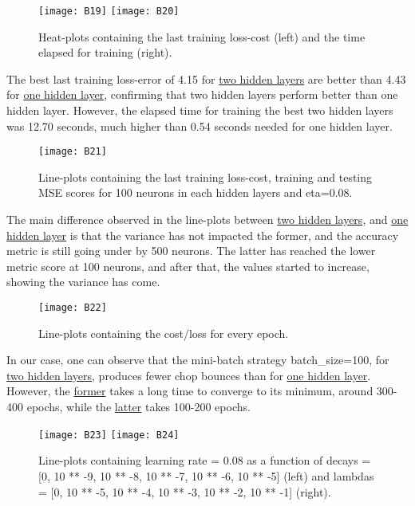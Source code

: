 \begin{figure}[H]
\label{fig:B13}
\centering
\texttt{[image: B19]}
\texttt{[image: B20]}
\caption{Heat-plots containing the last training loss-cost (left) and the time elapsed for training (right).}
\end{figure}

The best last training loss-error of 4.15 for \hyperref[fig:B13]{two hidden layers} are better than 4.43 for \hyperref[fig:B4]{one hidden layer}, confirming that two hidden layers perform better than one hidden layer. However, the elapsed time for training the best two hidden layers was 12.70 seconds, much higher than 0.54 seconds needed for one hidden layer.

\begin{figure}[H]
\label{fig:B14}
\centering
\texttt{[image: B21]}
\caption{Line-plots containing the last training loss-cost, training and testing MSE scores for 100 neurons in each hidden layers and eta=0.08.}
\end{figure}

The main difference observed in the line-plots between \hyperref[fig:B14]{two hidden layers}, and \hyperref[fig:B5]{one hidden layer} is that the variance has not impacted the former, and the accuracy metric is still going under by 500 neurons. The latter has reached the lower metric score at 100 neurons, and after that, the values started to increase, showing the variance has come.

\begin{figure}[H]
\label{fig:B15}
\centering
\texttt{[image: B22]}
\caption{Line-plots containing the cost/loss for every epoch.}
\end{figure}

In our case, one can observe that the mini-batch strategy batch\_size=100, for \hyperref[fig:B15]{two hidden layers}, produces fewer chop bounces than for \hyperref[fig:B6]{one hidden layer}. However, the \hyperref[fig:B15]{former} takes a long time to converge to its minimum, around 300-400 epochs, while the \hyperref[fig:B6]{latter} takes 100-200 epochs.\\

\begin{figure}[H]
\label{fig:B16}
\centering
\texttt{[image: B23]}
\texttt{[image: B24]}
\caption{Line-plots containing learning rate = 0.08 as a function of decays = [0, 10 ** -9, 10 ** -8, 10 ** -7, 10 ** -6, 10 ** -5] (left) and lambdas = [0, 10 ** -5, 10 ** -4, 10 ** -3, 10 ** -2, 10 ** -1] (right).}
\end{figure}

